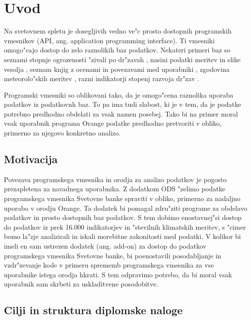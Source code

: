 
\chapter{Uvod}

Na svetovnem spletu je dosegljivih vedno ve"c prosto dostopnih programskih
vmesnikov (API, ang. application programming interface). Ti vmesniki omogo"cajo dostop
do zelo raznolikih baz podatkov. Nekateri primeri baz so                          
seznami stopnje ogrozenosti "zivali po dr"zavah ,    
nasini podatki meritev in slike vesolja  ,
seznam knjig z ocenami in povezavami med uporabniki ,
zgodovina meteorolo"skih meritev ,
razni indikatorji stopenj razvoja dr"zav .

Programski vmesniki so oblikovani tako, da je omogo"cena raznolika uporaba 
podatkov iz podatkovnh baz. To pa ima tudi slabost, ki je v tem, da je podatke 
potrebno predhodno obdelati za vsak namen posebej. Tako bi na primer moral vsak
uporabnik programa Orange podatke predhodno pretvoriti v obliko, primerno za 
njegovo konkretno analizo.


\section{Motivacija}

Povezava programskega vmesnika in orodja za analizo podatkov je pogosto    
prezapletena za navadnega uporabnika. Z dodatkom ODS "zelimo podatke
programskega vmesnika Svetovne banke spraviti v obliko, primerno za nadaljno 
uporabo v orodju Orange. Ta dodatek bi pomagal zdru"ziti programe za obdelavo 
podatkov in prosto dostopnih baz podatkov. S tem dobimo enostavnej"si dostop do
podatkov iz prek 16.000 indikatorjev in "stevilnih klimatskih meritev, 
s "cimer bomo la"zje analizirali in iskali morebitne zakonitosti med podatki.
V kolikor bi imeli en sam ustrezen dodatek (ang. add-on) za dostop do podatkov 
programskega vmesnika Svetovne banke, bi poenostavili posodabljanje in 
vzdr"zevanje kode v primeru sprememb programskega vmesnika za vse uporabnike
istega orodja hkrati. S tem odpravimo potrebo, da bi moral vsak uporabnik sam
skrbeti za uskladitvene posodobitve.


\section{Cilji in struktura diplomske naloge}

